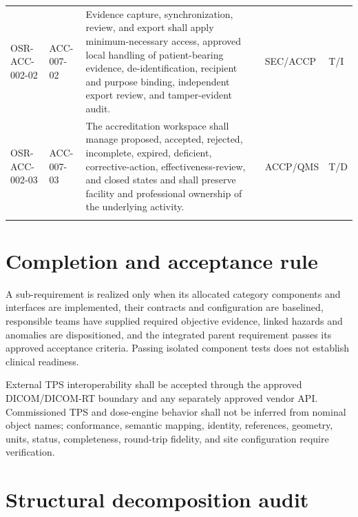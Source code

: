 \documentclass[11pt,letterpaper]{article}
\begin{document}
\begin{scriptsize}
\begin{longtable}{@{}L{0.16\textwidth}L{0.12\textwidth}L{0.45\textwidth}L{0.15\textwidth}L{0.07\textwidth}@{}}
\addlinespace[2pt]
\mbox{OSR-ACC-002-02} & \mbox{ACC-007-02} & Evidence capture, synchronization, review, and export shall apply minimum-necessary access, approved local handling of patient-bearing evidence, de-identification, recipient and purpose binding, independent export review, and tamper-evident audit. & SEC\slash\allowbreak{}ACCP & T\slash\allowbreak{}I \\
\addlinespace[2pt]
\mbox{OSR-ACC-002-03} & \mbox{ACC-007-03} & The accreditation workspace shall manage proposed, accepted, rejected, incomplete, expired, deficient, corrective-action, effectiveness-review, and closed states and shall preserve facility and professional ownership of the underlying activity. & ACCP\slash\allowbreak{}QMS & T\slash\allowbreak{}D \\
\addlinespace[2pt]
\end{longtable}
\end{scriptsize}

\section{Completion and acceptance rule}

A sub-requirement is realized only when its allocated category components and interfaces are implemented, their contracts and configuration are baselined, responsible teams have supplied required objective evidence, linked hazards and anomalies are dispositioned, and the integrated parent requirement passes its approved acceptance criteria. Passing isolated component tests does not establish clinical readiness.

External TPS interoperability shall be accepted through the approved DICOM/DICOM-RT boundary and any separately approved vendor API. Commissioned TPS and dose-engine behavior shall not be inferred from nominal object names; conformance, semantic mapping, identity, references, geometry, units, status, completeness, round-trip fidelity, and site configuration require verification.

\section{Structural decomposition audit}
\end{document}
